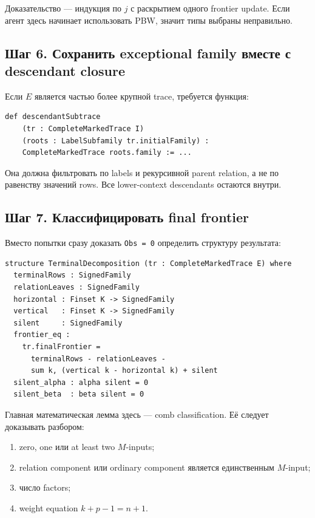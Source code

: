 \documentclass[11pt,a4paper]{article}
\theoremstyle{definition}
\theoremstyle{remark}
\begin{document}
Доказательство --- индукция по $j$ с раскрытием одного frontier update. Если
агент здесь начинает использовать PBW, значит типы выбраны неправильно.

\subsection{Шаг 6. Сохранить exceptional family вместе с descendant closure}

Если $E$ является частью более крупной trace, требуется функция:

\begin{lstlisting}
def descendantSubtrace
    (tr : CompleteMarkedTrace I)
    (roots : LabelSubfamily tr.initialFamily) :
    CompleteMarkedTrace roots.family := ...
\end{lstlisting}

Она должна фильтровать по labels и рекурсивной parent relation, а не по
равенству значений rows. Все lower-context descendants остаются внутри.

\subsection{Шаг 7. Классифицировать final frontier}

Вместо попытки сразу доказать \texttt{Obs = 0} определить структуру результата:

\begin{lstlisting}
structure TerminalDecomposition (tr : CompleteMarkedTrace E) where
  terminalRows : SignedFamily
  relationLeaves : SignedFamily
  horizontal : Finset K -> SignedFamily
  vertical   : Finset K -> SignedFamily
  silent     : SignedFamily
  frontier_eq :
    tr.finalFrontier =
      terminalRows - relationLeaves -
      sum k, (vertical k - horizontal k) + silent
  silent_alpha : alpha silent = 0
  silent_beta  : beta silent = 0
\end{lstlisting}

Главная математическая лемма здесь --- comb classification. Её следует
доказывать разбором:
\begin{enumerate}
\item zero, one или at least two $M$-inputs;
\item relation component или ordinary component является единственным
$M$-input;
\item число factors;
\item weight equation $k+p-1=n+1$.
\end{enumerate}
\end{document}

